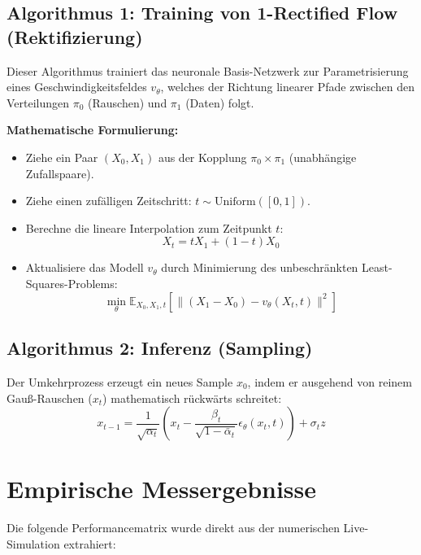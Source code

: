 \documentclass[11pt,a4paper]{article}
\begin{document}
\subsection{Algorithmus 1: Training von 1-Rectified Flow (Rektifizierung)}
Dieser Algorithmus trainiert das neuronale Basis-Netzwerk zur Parametrisierung eines Geschwindigkeitsfeldes $v_\theta$, welches der Richtung linearer Pfade zwischen den Verteilungen $\pi_0$ (Rauschen) und $\pi_1$ (Daten) folgt.

\textbf{Mathematische Formulierung:}
\begin{itemize}
    \item Ziehe ein Paar $(X_0, X_1)$ aus der Kopplung $\pi_0 \times \pi_1$ (unabhängige Zufallspaare).
    \item Ziehe einen zufälligen Zeitschritt: $t \sim \text{Uniform}([0, 1])$.
    \item Berechne die lineare Interpolation zum Zeitpunkt $t$:
    \begin{equation}
        X_t = t X_1 + (1 - t) X_0
    \end{equation}
    \item Aktualisiere das Modell $v_\theta$ durch Minimierung des unbeschränkten Least-Squares-Problems:
    \begin{equation}
        \min_\theta \mathbb{E}_{X_0, X_1, t} \left[ \| (X_1 - X_0) - v_\theta(X_t, t) \|^2 \right]
    \end{equation}
\end{itemize}

\subsection{Algorithmus 2: Inferenz (Sampling)}
Der Umkehrprozess erzeugt ein neues Sample $x_0$, indem er ausgehend von reinem Gauß-Rauschen ($x_t$) mathematisch rückwärts schreitet:
\begin{equation}
    x_{t-1} = \frac{1}{\sqrt{\alpha_t}} \left( x_t - \frac{\beta_t}{\sqrt{1 - \bar{\alpha}_t}} \epsilon_\theta(x_t, t) \right) + \sigma_t z
\end{equation}

\section{Empirische Messergebnisse}
Die folgende Performancematrix wurde direkt aus der numerischen Live-Simulation extrahiert:
\end{document}
